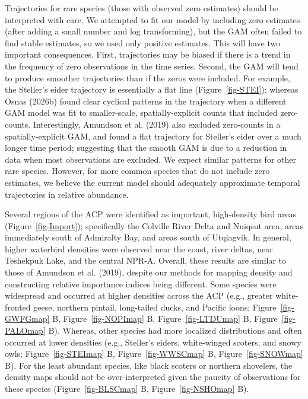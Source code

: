 \documentclass[
]{article}
\begin{document}
Trajectories for rare species (those with observed zero estimates)
should be interpreted with care. We attempted to fit our model by
including zero estimates (after adding a small number and log
transforming), but the GAM often failed to find stable estimates, so we
used only positive estimates. This will have two important consequences.
First, trajectories may be biased if there is a trend in the frequency
of zero observations in the time series. Second, the GAM will tend to
produce smoother trajectories than if the zeros were included. For
example, the Steller's eider trajectory is essentially a flat line
(Figure~\ref{fig-STEI}); whereas Osnas (2026b) found clear cyclical
patterns in the trajectory when a different GAM model was fit to
smaller-scale, spatially-explicit counts that included zero-counts.
Interestingly, Amundson et al. (2019) also excluded zero-counts in a
spatially-explicit GAM, and found a flat trajectory for Steller's eider
over a much longer time period; suggesting that the smooth GAM is due to
a reduction in data when most observations are excluded. We expect
similar patterns for other rare species. However, for more common
species that do not include zero estimates, we believe the current model
should adequately approximate temporal trajectories in relative
abundance.

Several regions of the ACP were identified as important, high-density
bird areas (Figure~\ref{fig-Import}); specifically the Colville River
Delta and Nuiqsut area, areas immediately south of Admiralty Bay, and
areas south of Utqiagvik. In general, higher waterbird densities were
observed near the coast, river deltas, near Teshekpuk Lake, and the
central NPR-A. Overall, these results are similar to those of Amundson
et al. (2019), despite our methods for mapping density and constructing
relative importance indices being different. Some species were
widespread and occurred at higher densities across the ACP (e.g.,
greater white-fronted geese, northern pintail, long-tailed ducks, and
Pacific loons; Figure~\ref{fig-GWFGmap} B, Figure~\ref{fig-NOPImap} B,
Figure~\ref{fig-LTDUmap} B, Figure~\ref{fig-PALOmap} B). Whereas, other
species had more localized distributions and often occurred at lower
densities (e.g., Steller's eiders, white-winged scoters, and snowy owls;
Figure~\ref{fig-STEImap} B, Figure~\ref{fig-WWSCmap} B,
Figure~\ref{fig-SNOWmap} B). For the least abundant species, like black
scoters or northern shovelers, the density maps should not be
over-interpreted given the paucity of observations for these species
(Figure~\ref{fig-BLSCmap} B, Figure~\ref{fig-NSHOmap} B).
\end{document}
